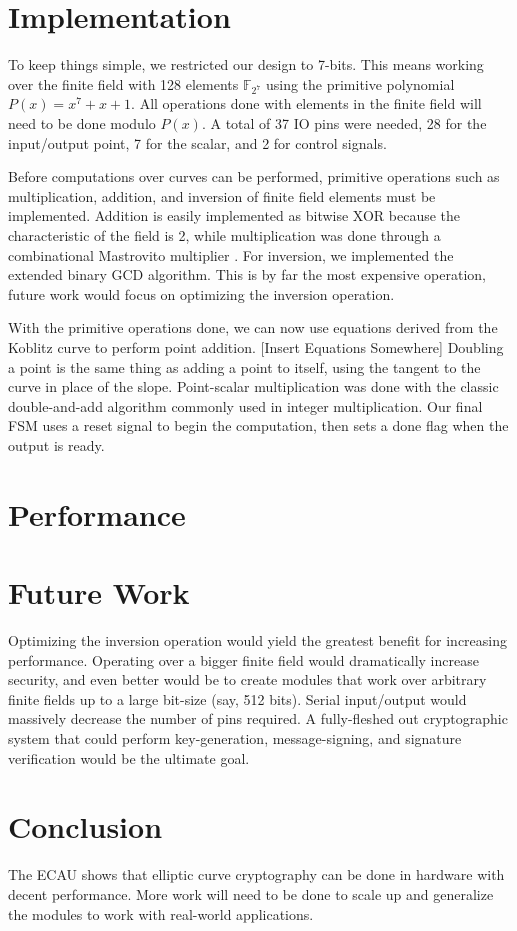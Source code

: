 \documentclass{IEEEtran}
\begin{document}
\section{Implementation}

To keep things simple, we restricted our design to 7-bits. This means working over the finite field with 128 elements $\mathbb{F}_{2^7}$ using the primitive polynomial $P(x) = x^7 + x + 1$. All operations done with elements in the finite field will need to be done modulo $P(x)$. A total of 37 IO pins were needed, 28 for the input/output point, 7 for the scalar, and 2 for control signals. 


Before computations over curves can be performed, primitive operations such as multiplication, addition, and inversion of finite field elements must be implemented. Addition is easily implemented as bitwise XOR because the characteristic of the field is 2, while multiplication was done through a combinational Mastrovito multiplier \cite{Kallabook}. For inversion, we implemented the extended binary GCD algorithm. This is by far the most expensive operation, future work would focus on optimizing the inversion operation.

With the primitive operations done, we can now use equations derived from the Koblitz curve to perform point addition. [Insert Equations Somewhere] Doubling a point is the same thing as adding a point to itself, using the tangent to the curve in place of the slope. Point-scalar multiplication was done with the classic double-and-add algorithm commonly used in integer multiplication. Our final FSM uses a reset signal to begin the computation, then sets a done flag when the output is ready. 

\section{Performance}

\section{Future Work}
Optimizing the inversion operation would yield the greatest benefit for increasing performance. Operating over a bigger finite field would dramatically increase security, and even better would be to create modules that work over arbitrary finite fields up to a large bit-size (say, 512 bits). Serial input/output would massively decrease the number of pins required. A fully-fleshed out cryptographic system that could perform key-generation, message-signing, and signature verification would be the ultimate goal. 

\section{Conclusion}
The ECAU shows that elliptic curve cryptography can be done in hardware with decent performance. More work will need to be done to scale up and generalize the modules to work with real-world applications. 



\end{document}
